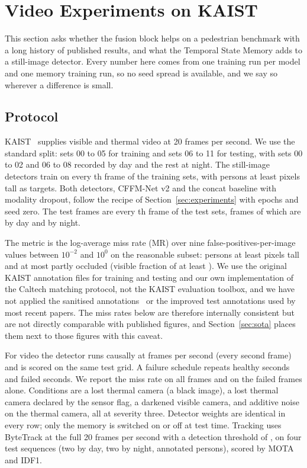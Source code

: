 \section{Video Experiments on KAIST}
\label{sec:video}
This section asks whether the fusion block helps on a pedestrian benchmark with a long history of published results, and what the Temporal State Memory adds to a still-image detector. Every number here comes from one training run per model and one memory training run, so no seed spread is available, and we say so wherever a difference is small.

\subsection{Protocol}
\label{sec:kaistprotocol}
KAIST~\cite{hwang2015kaist} supplies visible and thermal video at 20 frames per second. We use the standard split: sets 00 to 05 for training and sets 06 to 11 for testing, with sets 00 to 02 and 06 to 08 recorded by day and the rest at night. The still-image detectors train on every \cfgKaistTrainStride{}th frame of the training sets, with persons at least \cfgKaistTrainMinH{} pixels tall as targets. Both detectors, CFFM-Net v2 and the concat baseline with modality dropout, follow the recipe of Section~\ref{sec:experiments} with \cfgKaistEpochs{} epochs and seed zero. The test frames are every \cfgKaistTestStride{}th frame of the test sets, \kstNAll{} frames of which \kstNDay{} are by day and \kstNNight{} by night.

The metric is the log-average miss rate (MR) over nine false-positives-per-image values between $10^{-2}$ and $10^{0}$ on the reasonable subset: persons at least \cfgKaistMinH{} pixels tall and at most partly occluded (visible fraction of at least \cfgKaistMinVis{}). We use the original KAIST annotation files for training and testing and our own implementation of the Caltech matching protocol, not the KAIST evaluation toolbox, and we have not applied the sanitised annotations~\cite{li2018kaistsanitized} or the improved test annotations used by most recent papers. The miss rates below are therefore internally consistent but are not directly comparable with published figures, and Section~\ref{sec:sota} places them next to those figures with this caveat.

For video the detector runs causally at \cfgFailFps{} frames per second (every second frame) and is scored on the same test grid. A failure schedule repeats \cfgFailSeconds{} healthy seconds and \cfgFailSeconds{} failed seconds. We report the miss rate on all frames and on the failed frames alone. Conditions are a lost thermal camera (a black image), a lost thermal camera declared by the sensor flag, a darkened visible camera, and additive noise on the thermal camera, all at severity three. Detector weights are identical in every row; only the memory is switched on or off at test time. Tracking uses ByteTrack at the full 20 frames per second with a detection threshold of \cfgTrackConf{}, on four test sequences (two by day, two by night, \trkUniqueTotal{} annotated persons), scored by MOTA and IDF1.


